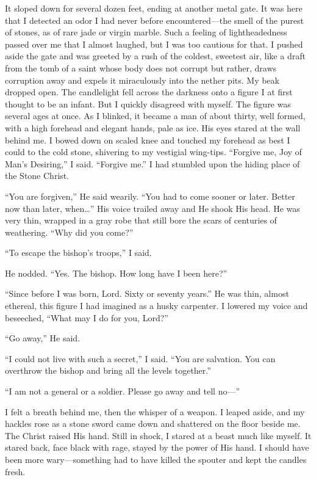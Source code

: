 It sloped down for several dozen feet, ending at another metal gate. It was here that I detected an odor I had never before encountered—the smell of the purest of stones, as of rare jade or virgin marble. Such a feeling of lightheadedness passed over me that I almost laughed, but I was too cautious for that. I pushed aside the gate and was greeted by a rush of the coldest, sweetest air, like a draft from the tomb of a saint whose body does not corrupt but rather, draws corruption away and expels it miraculously into the nether pits. My beak dropped open. The candlelight fell across the darkness onto a figure I at first thought to be an infant. But I quickly disagreed with myself. The figure was several ages at once. As I blinked, it became a man of about thirty, well formed, with a high forehead and elegant hands, pale as ice. His eyes stared at the wall behind me. I bowed down on scaled knee and touched my forehead as best I could to the cold stone, shivering to my vestigial wing-tips. ``Forgive me, Joy of Man's Desiring,'' I said. ``Forgive me.'' I had stumbled upon the hiding place of the Stone Christ.

``You are forgiven,'' He said wearily. ``You had to come sooner or later. Better now than later, when\ldots'' His voice trailed away and He shook His head. He was very thin, wrapped in a gray robe that still bore the scars of centuries of weathering. ``Why did you come?''

``To escape the bishop's troops,'' I said.

He nodded. ``Yes. The bishop. How long have I been here?''

``Since before I was born, Lord. Sixty or seventy years.'' He was thin, almost ethereal, this figure I had imagined as a husky carpenter. I lowered my voice and beseeched, ``What may I do for you, Lord?''

``Go away,'' He said.

``I could not live with such a secret,'' I said. ``You are salvation. You can overthrow the bishop and bring all the levels together.''

``I am not a general or a soldier. Please go away and tell no—''

I felt a breath behind me, then the whisper of a weapon. I leaped aside, and my hackles rose as a stone sword came down and shattered on the floor beside me. The Christ raised His hand. Still in shock, I stared at a beast much like myself. It stared back, face black with rage, stayed by the power of His hand. I should have been more wary—something had to have killed the spouter and kept the candles fresh.

